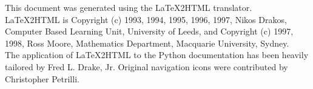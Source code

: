 
This document was generated using the LaTeX2HTML translator.\\

LaTeX2HTML is Copyright (c) 1993, 1994, 1995, 1996, 1997, Nikos Drakos,
Computer Based Learning Unit, University of Leeds, and Copyright (c) 1997, 1998,
Ross Moore, Mathematics Department, Macquarie University, Sydney.\\

The application of LaTeX2HTML to the Python documentation has been heavily
tailored by Fred L. Drake, Jr. Original navigation icons were contributed by
Christopher Petrilli.


